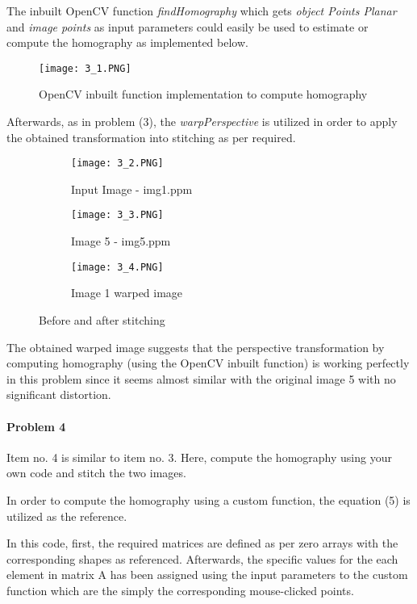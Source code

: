 \documentclass[11pt]{scrartcl}
\begin{document}
{The inbuilt OpenCV function \textit{findHomography} which gets \textit{object Points Planar} and \textit{image points} as input parameters could easily be used to estimate or compute the homography as implemented below.

\begin{figure}[H]
    \centering
    \texttt{[image: 3\_1.PNG]}
    \caption{OpenCV inbuilt function implementation to compute homography}
    \label{fig: PaleBlueDot}    
\end{figure}

Afterwards, as in problem (3), the \textit{warpPerspective} is utilized in order to apply the obtained transformation into stitching as per required.

\begin{figure}[H]
\centering
\begin{subfigure}{0.4\textwidth}
  \centering
  \texttt{[image: 3\_2.PNG]}
  \caption{Input Image - img1.ppm}
  \label{fig:sub2}
\end{subfigure}
\begin{subfigure}{0.4\textwidth}
  \centering
  \texttt{[image: 3\_3.PNG]}
  \caption{Image 5 - img5.ppm}
  \label{fig:sub2}
\end{subfigure}
\begin{subfigure}{0.4\textwidth}
  \centering
  \texttt{[image: 3\_4.PNG]}
  \caption{Image 1 warped image}
  \label{fig:sub2}
\end{subfigure}
\caption{Before and after stitching}
\label{fig:test}
\end{figure}

The obtained warped image suggests that the perspective transformation by computing homography (using the OpenCV inbuilt function) is working perfectly in this problem since it seems almost similar with the original image 5 with no significant distortion.

\paragraph*{Problem 4}
Item no. 4 is similar to item no. 3. Here, compute the homography using your own code and stitch the two images.

In order to compute the homography using a custom function, the equation (5) is utilized as the reference. 

In this code, first, the required matrices are defined as per zero arrays with the corresponding shapes as referenced. Afterwards, the specific values for the each element in matrix A has been assigned using the input parameters to the custom function  which are the simply the corresponding mouse-clicked points.

}
\end{document}
